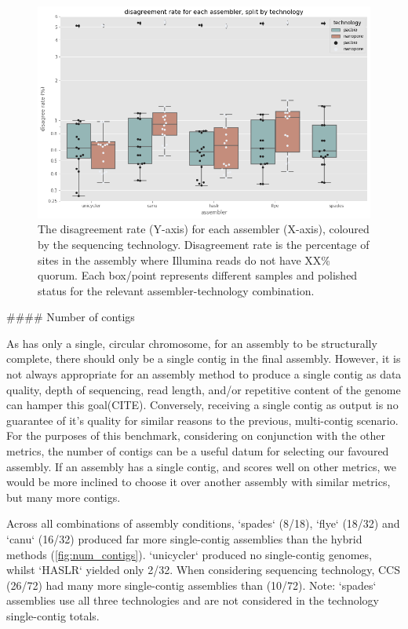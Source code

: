 \begin{figure}
\includegraphics[width=1.0\textwidth]{Chapter2/Figs/disagree_rate.png}
\centering
\caption{The disagreement rate (Y-axis) for each assembler (X-axis), coloured by the sequencing technology. Disagreement rate is the percentage of sites in the assembly where Illumina reads do not have XX\% quorum. Each box/point represents different samples and polished status for the relevant assembler-technology combination.}
\label{fig:disagree_rate}
\end{figure}

\begin{markdown}

#### Number of contigs

As \mtb{} has only a single, circular chromosome, for an assembly to be structurally complete, there should only be a single contig in the final assembly. However, it is not always appropriate for an assembly method to produce a single contig as data quality, depth of sequencing, read length, and/or repetitive content of the genome can hamper this goal(CITE). Conversely, receiving a single contig as output is no guarantee of it's quality for similar reasons to the previous, multi-contig scenario. For the purposes of this benchmark, considering on conjunction with the other metrics, the number of contigs can be a useful datum for selecting our favoured assembly. If an assembly has a single contig, and scores well on other metrics, we would be more inclined to choose it over another assembly with similar metrics, but many more contigs.

Across all combinations of assembly conditions, `spades` (8/18), `flye` (18/32) and `canu` (16/32) produced far more single-contig assemblies than the hybrid methods (\autoref{fig:num_contigs}). `unicycler` produced no single-contig genomes, whilst `HASLR` yielded only 2/32. When considering sequencing technology, CCS (26/72) had many more single-contig assemblies than \ont{} (10/72). Note: `spades` assemblies use all three technologies and are not considered in the technology single-contig totals.

\end{markdown}

